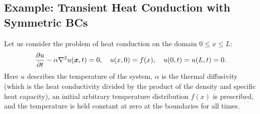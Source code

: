 \subsection{Example: Transient Heat Conduction with Symmetric BCs}

Let us consider the problem of heat conduction on the domain $0 \le x \le L$:
\begin{align}
  \frac{ \partial {u} }{ \partial {t} } - \alpha \nabla^2 u(\bm{x},t) = 0, \quad u(x,0) = f(x), \quad u(0,t) = u(L,t) = 0 .
\end{align}
Here $u$ describes the temperature of the system, $\alpha$ is the thermal diffusivity (which is the heat conductivity divided by the product of the density and specific heat capacity), an initial arbitrary temperature distribution $f(x)$ is prescribed, and the temperature is held constant at zero at the boundaries for all times.

